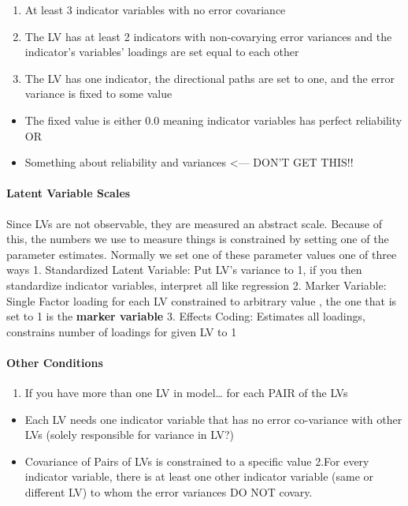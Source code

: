 \documentclass[]{book}
\providecommand{\tightlist}{%
  \setlength{\itemsep}{0pt}\setlength{\parskip}{0pt}}
\let\oldparagraph\paragraph
\renewcommand{\paragraph}[1]{\oldparagraph{#1}\mbox{}}
\theoremstyle{definition}
\theoremstyle{definition}
\theoremstyle{definition}
\theoremstyle{remark}
\begin{document}
\begin{enumerate}
\def\labelenumi{\arabic{enumi}.}
\tightlist
\item
  At least 3 indicator variables with no error covariance
\item
  The LV has at least 2 indicators with non-covarying error variances
  and the indicator's variables' loadings are set equal to each other
\item
  The LV has one indicator, the directional paths are set to one, and
  the error variance is fixed to some value
\end{enumerate}

\begin{itemize}
\tightlist
\item
  The fixed value is either 0.0 meaning indicator variables has perfect
  reliability OR
\item
  Something about reliability and variances \textless{}--- DON'T GET
  THIS!!
\end{itemize}

\paragraph{Latent Variable Scales}\label{latent-variable-scales}

Since LVs are not observable, they are measured an abstract scale.
Because of this, the numbers we use to measure things is constrained by
setting one of the parameter estimates. Normally we set one of these
parameter values one of three ways 1. Standardized Latent Variable: Put
LV's variance to 1, if you then standardize indicator variables,
interpret all like regression 2. Marker Variable: Single Factor loading
for each LV constrained to arbitrary value , the one that is set to 1 is
the \textbf{marker variable} 3. Effects Coding: Estimates all loadings,
constrains number of loadings for given LV to 1

\paragraph{Other Conditions}\label{other-conditions}

\begin{enumerate}
\def\labelenumi{\arabic{enumi}.}
\tightlist
\item
  If you have more than one LV in model\ldots{} for each PAIR of the LVs
\end{enumerate}

\begin{itemize}
\tightlist
\item
  Each LV needs one indicator variable that has no error co-variance
  with other LVs (solely responsible for variance in LV?)
\item
  Covariance of Pairs of LVs is constrained to a specific value 2.For
  every indicator variable, there is at least one other indicator
  variable (same or different LV) to whom the error variances DO NOT
  covary.
\end{itemize}
\end{document}
